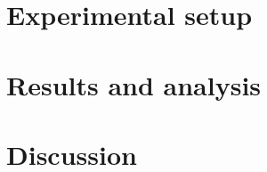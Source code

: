 \documentclass[10pt,a4paper]{article}
\begin{document}




\section{Experimental setup}
\label{sec:setup}





\section{Results and analysis}
\label{sec:results}





























\section{Discussion}
\label{sec:discussion}




\end{document}
